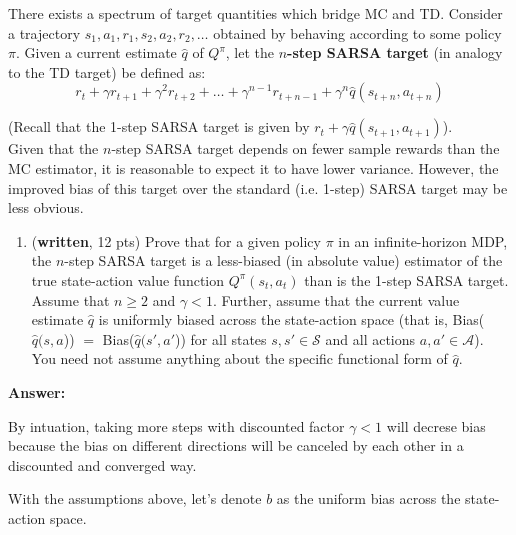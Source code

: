 \documentclass{article}
\begin{document}
There exists a spectrum of target quantities which bridge MC and TD. Consider a trajectory $s_1,a_1,r_1,s_2,a_2,r_2,\ldots$ obtained by behaving according to some policy $\pi$. Given a current estimate $\hat{q}$ of $Q^{\pi}$, let the \textbf{$n$-step SARSA target} (in analogy to the TD target) be defined as:
\[
r_t + \gamma r_{t+1} + \gamma^2 r_{t+2} + \ldots + \gamma^{n-1}r_{t + n -1} + \gamma^{n}\hat{q}(s_{t+n},a_{t+n})
\]

(Recall that the 1-step SARSA target is given by $r_t + \gamma \hat{q}(s_{t+1},a_{t+1})$).\\

Given that the $n$-step SARSA target depends on fewer sample rewards than the MC estimator, it is reasonable to expect it to have lower variance. However, the improved bias of this target over the standard (i.e. 1-step) SARSA target may be less obvious.

\begin{enumerate}
\item (\textbf{written}, 12 pts) Prove that for a given policy $\pi$ in an infinite-horizon MDP, the $n$-step SARSA target is a less-biased (in absolute value) estimator of the true state-action value function $Q^{\pi}(s_t,a_t)$ than is the 1-step SARSA target. Assume that $n \geq 2$ and $\gamma < 1$. Further, assume that the current value estimate $\hat{q}$ is uniformly biased across the state-action space (that is, Bias($\hat{q}(s, a$)) $=$ Bias($\hat{q}(s', a'$)) for all states $s, s' \in \mathcal{S}$ and all actions $a, a' \in\mathcal{A}$). You need not assume anything about the specific functional form of $\hat{q}$.
\end{enumerate}

\printbibliography

\textbf{Answer:}

By intuation, taking more steps with discounted factor $\gamma < 1$ will decrese bias because the bias on different directions will be canceled by each other in a discounted and converged way.

With the assumptions above, let's denote $b$ as the uniform bias across the state-action space.
\end{document}
